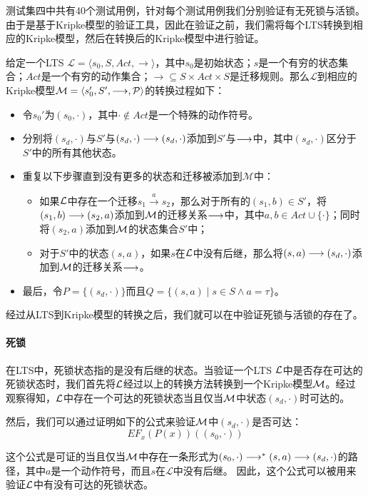 测试集四中共有40个测试用例，针对每个测试用例我们分别验证有无死锁与活锁。由于\sctlprov{}是基于Kripke模型的验证工具，因此在验证之前，我们需将每个\textsf{LTS}转换到相应的Kripke模型，然后在转换后的Kripke模型中进行验证。


给定一个\textsf{LTS} $\mathcal{L} = \langle s_0, S, Act, \rightarrow \rangle$，其中$s_0$是初始状态；$s$是一个有穷的状态集合；$Act$是一个有穷的动作集合；$\rightarrow \subseteq S\times Act\times S$是迁移规则。那么$\mathcal{L}$到相应的Kripke模型$\mathcal{M} = \langle s_0', S', \longrightarrow, {\mathcal P} \rangle$的转换过程如下：

\begin{itemize}
	\item 令$s_0'$为$(s_0, \cdot)$，其中$\cdot\notin Act$是一个特殊的动作符号。
	\item 分别将$(s_d,\cdot)$与$S'$与$(s_d,\cdot)\longrightarrow (s_d,\cdot)$添加到$S'$与$\longrightarrow$中，其中$(s_d,\cdot)$区分于$S'$中的所有其他状态。
	\item 重复以下步骤直到没有更多的状态和迁移被添加到$\mathcal{M}$中：
	\begin{itemize}
		\item 如果$\cal L$中存在一个迁移$s_1\stackrel{a}\rightarrow s_2$，那么对于所有的$(s_1, b)\in S'$，将$(s_1, b)\longrightarrow (s_2, a)$添加到$\cal M$的迁移关系$\longrightarrow$中，其中$a, b\in Act\cup\{\cdot\}$；同时将$(s_2, a)$添加到$\cal M$的状态集合$S'$中；
		\item 对于$S'$中的状态$(s,a)$，如果$s$在$\cal L$中没有后继，那么将$(s,a)\longrightarrow (s_d,\cdot)$添加到$\cal M$的迁移关系$\longrightarrow$。
	\end{itemize}
	\item 最后，令$P=\{(s_d,\cdot)\}$而且$Q = \{(s,a)\mid s\in S\wedge a=\tau\}$。
\end{itemize}
经过从\textsf{LTS}到Kripke模型的转换之后，我们就可以在\sctlprov{}中验证死锁与活锁的存在了。

\paragraph{死锁}
在\textsf{LTS}中，死锁状态指的是没有后继的状态。当验证一个\textsf{LTS} $\cal L$中是否存在可达的死锁状态时，我们首先将$\cal L$经过以上的转换方法转换到一个Kripke模型$\cal M$。经过观察得知，$\cal L$中存在一个可达的死锁状态当且仅当$\cal M$中状态$(s_d,\cdot)$时可达的。

然后，我们可以通过证明如下的公式来验证$\cal M$中$(s_d,\cdot)$是否可达：
$$EF_x(P(x))((s_0,\cdot))$$ 

这个公式是可证的当且仅当$\cal M$中存在一条形式为$(s_0,\cdot)\longrightarrow^*(s,a)\longrightarrow (s_d,\cdot)$的路径，其中$a$是一个动作符号，而且$s$在$\mathcal{L}$中没有后继。
因此，这个公式可以被用来验证$\cal L$中有没有可达的死锁状态。 

